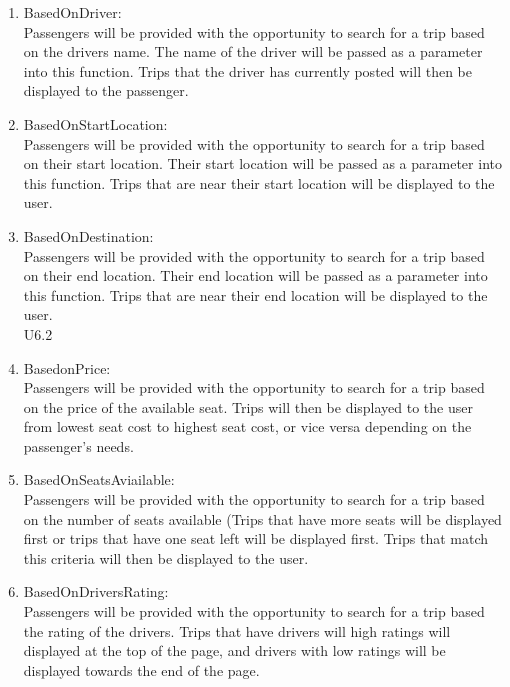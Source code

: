 \documentclass[hidelinks, 12pt, a4paper]{article}
\begin{document}
             \begin{enumerate}[label=U1.\arabic*]

                \item BasedOnDriver:\\
                Passengers will be provided with the opportunity to search for a trip based on the drivers name. The name of the driver will be passed as a parameter into this function. Trips that the driver has currently posted will then be displayed to the passenger.\\
                 

                \item BasedOnStartLocation:\\
                Passengers will be provided with the opportunity to search for a trip based on their start location. Their start location  will be passed as a parameter into this function. Trips that are near their start location will be displayed to the user.\\

                \item BasedOnDestination:\\
                Passengers will be provided with the opportunity to search for a trip based on their end  location. Their end  location  will be passed as a parameter into this function. Trips that are near their end location will be displayed to the user.\\
                U6.2 
	
                \item BasedonPrice: \\
                Passengers will be provided with the opportunity to search for a trip based on the price of the available seat. Trips will then be displayed to the user from lowest seat cost to highest seat cost, or vice versa depending on the passenger’s needs.\\
                    
                \item BasedOnSeatsAviailable:\\
                Passengers will be provided with the opportunity to search for a trip based on the number of seats available (Trips that have more seats will be displayed first or trips that have one seat left will be displayed first. Trips that match this criteria will then be displayed to the user. \\
                    
                \item BasedOnDriversRating:\\
                Passengers will be provided with the opportunity to search for a trip based the rating of the drivers. Trips that have drivers will high ratings will displayed at the top of the page, and drivers with low ratings will be displayed towards the end of the page.\\


\end{enumerate}
\end{document}
